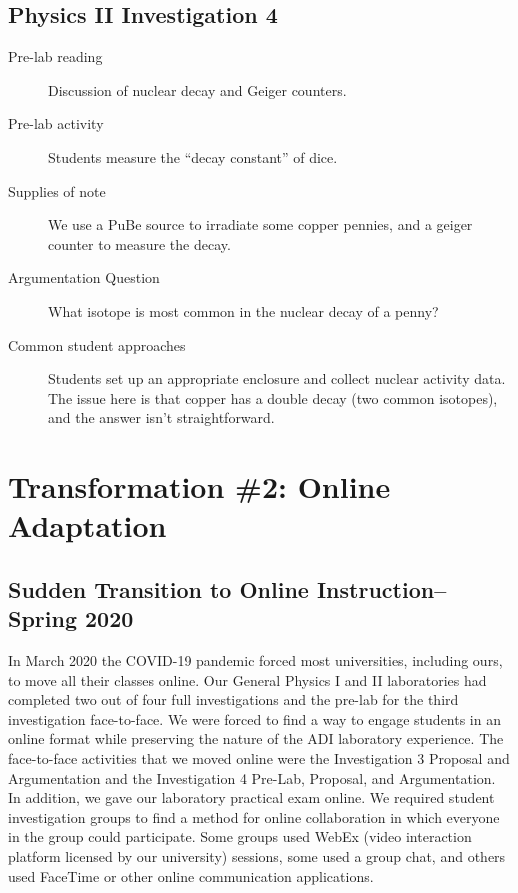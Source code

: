 \documentclass[aip, numerical, preprint]{revtex4-2}
\begin{document}
\subsection{Physics \textrm{II} Investigation 4}
\begin{description}
  \item[Pre-lab reading] Discussion of nuclear decay and Geiger counters.
  \item[Pre-lab activity] Students measure the ``decay constant'' of dice.
  \item[Supplies of note] We use a PuBe source to irradiate some copper pennies, and a geiger
  counter to measure the decay.
  \item[Argumentation Question] What isotope is most common in the nuclear decay of a penny?
  \item[Common student approaches] Students set up an appropriate enclosure and collect nuclear
  activity data.  The issue here is that copper has a double decay (two common isotopes), and
  the answer isn't straightforward.
\end{description}


\section{Transformation \#2: Online Adaptation}

\subsection{Sudden Transition to Online Instruction--Spring 2020}

In March 2020 the COVID-19 pandemic forced most universities, including ours, to move all their
classes online. Our General Physics I and II laboratories had completed two out of four full
investigations and the pre-lab for the third investigation face-to-face. We were forced to find
a way to engage students in an online format while preserving the nature of the ADI laboratory
experience. The face-to-face activities that we moved online were the Investigation 3 Proposal
and Argumentation and the Investigation 4 Pre-Lab, Proposal, and Argumentation. In addition, we
gave our laboratory practical exam online. We required student investigation groups to find a
method for online collaboration in which everyone in the group could participate. Some groups
used WebEx (video interaction platform licensed by our university) sessions, some used a
group chat, and others used FaceTime or other online communication applications.
\end{document}
